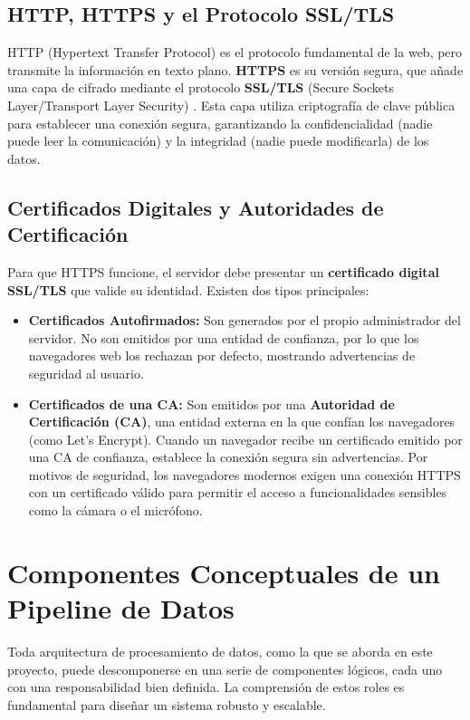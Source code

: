 \subsection{HTTP, HTTPS y el Protocolo SSL/TLS}
HTTP (Hypertext Transfer Protocol) es el protocolo fundamental de la web, pero transmite la información en texto plano. \textbf{HTTPS} es su versión segura, que añade una capa de cifrado mediante el protocolo \textbf{SSL/TLS} (Secure Sockets Layer/Transport Layer Security) \cite{rescorla2001ssl}. Esta capa utiliza criptografía de clave pública para establecer una conexión segura, garantizando la confidencialidad (nadie puede leer la comunicación) y la integridad (nadie puede modificarla) de los datos.

\subsection{Certificados Digitales y Autoridades de Certificación}
Para que HTTPS funcione, el servidor debe presentar un \textbf{certificado digital SSL/TLS} que valide su identidad. Existen dos tipos principales:
\begin{itemize}
    \item \textbf{Certificados Autofirmados:} Son generados por el propio administrador del servidor. No son emitidos por una entidad de confianza, por lo que los navegadores web los rechazan por defecto, mostrando advertencias de seguridad al usuario.
    \item \textbf{Certificados de una CA:} Son emitidos por una \textbf{Autoridad de Certificación (CA)}, una entidad externa en la que confían los navegadores (como Let's Encrypt). Cuando un navegador recibe un certificado emitido por una CA de confianza, establece la conexión segura sin advertencias. Por motivos de seguridad, los navegadores modernos exigen una conexión HTTPS con un certificado válido para permitir el acceso a funcionalidades sensibles como la cámara o el micrófono.
\end{itemize}

\section{Componentes Conceptuales de un Pipeline de Datos}
\label{sec:conceptos_pipeline}

Toda arquitectura de procesamiento de datos, como la que se aborda en este proyecto, puede descomponerse en una serie de componentes lógicos, cada uno con una responsabilidad bien definida. La comprensión de estos roles es fundamental para diseñar un sistema robusto y escalable.

